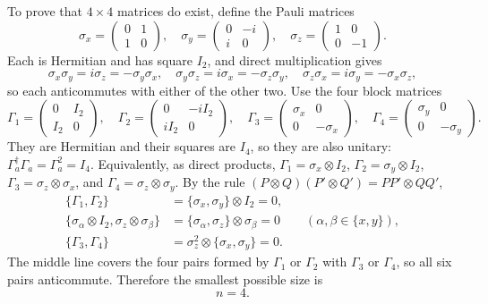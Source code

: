 To prove that $4\times4$ matrices do exist, define the Pauli matrices
\[
\sigma_x=\begin{pmatrix}0&1\\1&0\end{pmatrix},\quad
\sigma_y=\begin{pmatrix}0&-i\\i&0\end{pmatrix},\quad
\sigma_z=\begin{pmatrix}1&0\\0&-1\end{pmatrix}.
\]
Each is Hermitian and has square $I_2$, and direct multiplication gives
\[
\sigma_x\sigma_y=i\sigma_z=-\sigma_y\sigma_x,\quad
\sigma_y\sigma_z=i\sigma_x=-\sigma_z\sigma_y,\quad
\sigma_z\sigma_x=i\sigma_y=-\sigma_x\sigma_z,
\]
so each anticommutes with either of the other two. Use the four block
matrices
\[
\Gamma_1=\begin{pmatrix}0&I_2\\I_2&0\end{pmatrix},\quad
\Gamma_2=\begin{pmatrix}0&-iI_2\\iI_2&0\end{pmatrix},\quad
\Gamma_3=\begin{pmatrix}\sigma_x&0\\0&-\sigma_x\end{pmatrix},\quad
\Gamma_4=\begin{pmatrix}\sigma_y&0\\0&-\sigma_y\end{pmatrix}.
\]
They are Hermitian and their squares are $I_4$, so they are also
unitary: $\Gamma_a^\dagger\Gamma_a=\Gamma_a^2=I_4$. Equivalently, as
direct products,
$\Gamma_1=\sigma_x\otimes I_2$, $\Gamma_2=\sigma_y\otimes I_2$,
$\Gamma_3=\sigma_z\otimes\sigma_x$, and
$\Gamma_4=\sigma_z\otimes\sigma_y$.
By the rule $(P\otimes Q)(P'\otimes Q')=PP'\otimes QQ'$,
\begin{align*}
\{\Gamma_1,\Gamma_2\}&=\{\sigma_x,\sigma_y\}\otimes I_2=0,\\
\{\sigma_\alpha\otimes I_2,\sigma_z\otimes\sigma_\beta\}
&=\{\sigma_\alpha,\sigma_z\}\otimes\sigma_\beta=0
\qquad(\alpha,\beta\in\{x,y\}),\\
\{\Gamma_3,\Gamma_4\}&=\sigma_z^2\otimes\{\sigma_x,\sigma_y\}=0.
\end{align*}
The middle line covers the four pairs formed by $\Gamma_1$ or
$\Gamma_2$ with $\Gamma_3$ or $\Gamma_4$, so all six pairs
anticommute. Therefore the smallest possible size is
\[
\boxed{n=4.}
\]

